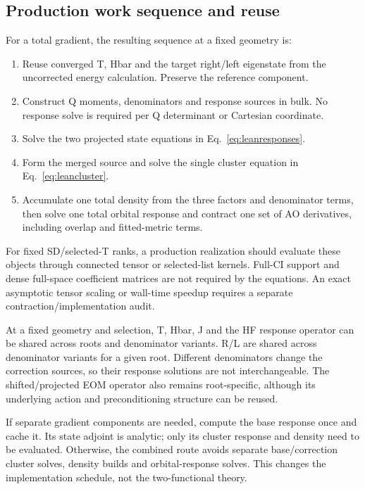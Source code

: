 \subsection{Production work sequence and reuse}
For a total gradient, the resulting sequence at a fixed geometry is:
\begin{enumerate}
 \item Reuse converged T, Hbar and the target right/left eigenstate from the
       uncorrected energy calculation. Preserve the reference component.
 \item Construct Q moments, denominators and response sources in bulk.
       No response solve is required per Q determinant or Cartesian coordinate.
 \item Solve the two projected state equations in Eq.~\eqref{eq:leanresponses}.
 \item Form the merged source and solve the single cluster equation in
       Eq.~\eqref{eq:leancluster}.
 \item Accumulate one total density from the three factors and denominator
       terms, then solve one total orbital response and contract one set of
       AO derivatives, including overlap and fitted-metric terms.
\end{enumerate}
For fixed SD/selected-T ranks, a production realization should evaluate these
objects through connected tensor or selected-list kernels. Full-CI support
and dense full-space coefficient matrices are not required by the equations.
An exact asymptotic tensor scaling or wall-time speedup requires a separate
contraction/implementation audit.

At a fixed geometry and selection, T, Hbar, J and the HF response operator
can be shared across roots and denominator variants. R/L are shared across
denominator variants for a given root. Different denominators change the
correction sources, so their response solutions are not interchangeable.
The shifted/projected EOM operator also remains root-specific, although its
underlying action and preconditioning structure can be reused.

If separate gradient components are needed, compute the base response once
and cache it. Its state adjoint is analytic; only its cluster response and
density need to be evaluated. Otherwise, the combined route avoids separate
base/correction cluster solves, density builds and orbital-response solves.
This changes the implementation schedule, not the two-functional theory.

